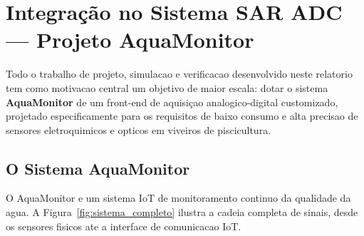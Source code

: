 \documentclass[12pt, a4paper]{article}
\begin{document}
\section{Integração no Sistema SAR ADC --- Projeto AquaMonitor}
\label{sec:integracao}

Todo o trabalho de projeto, simulacao e verificacao desenvolvido neste relatorio
tem como motivacao central um objetivo de maior escala: dotar o sistema
\textbf{AquaMonitor} de um front-end de aquisiçao analogico-digital customizado,
projetado especificamente para os requisitos de baixo consumo e alta precisao
de sensores eletroquimicos e opticos em viveiros de piscicultura.

\subsection{O Sistema AquaMonitor}

O AquaMonitor e um sistema IoT de monitoramento continuo da qualidade da agua.
A Figura~\ref{fig:sistema_completo} ilustra a cadeia completa de sinais, desde
os sensores fisicos ate a interface de comunicacao IoT.
\end{document}
